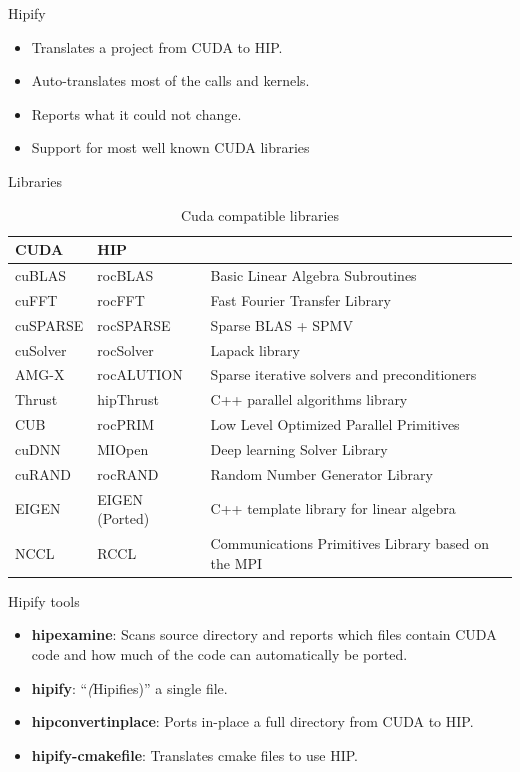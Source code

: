 \documentclass[aspectratio=169]{beamer}
\begin{document}
\begin{frame}{Hipify}

\begin{itemize}
    \item Translates a project from CUDA to HIP.
    \item Auto-translates most of the calls and kernels.
    \item Reports what it could not change.
    \item Support for most well known CUDA libraries
\end{itemize}
\end{frame}

\begin{frame}{Libraries}
\begin{table}[]
    \centering
    \begin{tabular}{l|l|l}
CUDA & HIP & \\
\hline
cuBLAS &	rocBLAS &	Basic Linear Algebra Subroutines\\
cuFFT &	rocFFT &	Fast Fourier Transfer Library\\
cuSPARSE &	rocSPARSE &	Sparse BLAS + SPMV\\
cuSolver &	rocSolver &	Lapack library\\
AMG-X &	rocALUTION & 	Sparse iterative solvers and preconditioners\\
Thrust& 	hipThrust &	C++ parallel algorithms library\\
CUB &	rocPRIM &	Low Level Optimized Parallel Primitives\\
cuDNN 	&MIOpen &	Deep learning Solver Library\\
cuRAND &	rocRAND &	Random Number Generator Library\\
EIGEN &	EIGEN (Ported) &	C++ template library for linear algebra\\
NCCL &	RCCL &	Communications Primitives Library based on the MPI  \\
\end{tabular}
    \caption{Cuda compatible libraries}
    \label{tab:my_label}
\end{table}
\end{frame}


\begin{frame}{Hipify tools}
\begin{itemize}
    \item \textbf{hipexamine}:
        Scans source directory and reports which files contain CUDA code and how much of the code can automatically be ported.
    \item \textbf{hipify}:
        ``\textit(Hipifies)'' a single file.
    \item \textbf{hipconvertinplace}:
         Ports in-place a full directory from CUDA to HIP.
    \item \textbf{hipify-cmakefile}:
          Translates cmake files to use HIP.
\end{itemize}
\end{frame}
\end{document}
